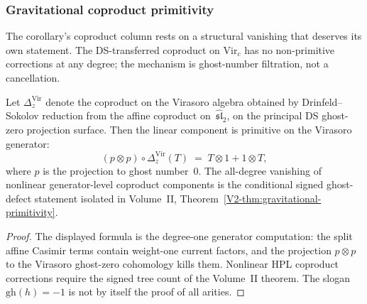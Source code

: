 \subsubsection*{Gravitational coproduct primitivity}

The corollary's coproduct column rests on a structural
vanishing that deserves its own statement. The DS-transferred
coproduct on $\mathrm{Vir}_c$ has no non-primitive corrections at
any degree; the mechanism is ghost-number filtration, not a
cancellation.

\begin{theorem}
\label{thm:grav-coproduct-primitive}
Let\/ $\Delta_z^{\mathrm{Vir}}$ denote the coproduct on the
Virasoro algebra obtained by Drinfeld--Sokolov reduction from the
affine coproduct on~$\widehat{\mathfrak{sl}}_2$, on the principal
DS ghost-zero projection surface. Then the linear component is
primitive on the Virasoro generator:
\begin{equation}\label{eq:grav-coproduct-primitive}
(p \otimes p) \circ \Delta_z^{\mathrm{Vir}}(T)
\;=\;
T \otimes 1 + 1 \otimes T,
\end{equation}
where $p$ is the projection to ghost number~$0$. The all-degree
vanishing of nonlinear generator-level coproduct components is the
conditional signed ghost-defect statement isolated in Volume~II,
Theorem~\textup{\ref*{V2-thm:gravitational-primitivity}}.
\end{theorem}

\begin{proof}
The displayed formula is the degree-one generator computation: the
split affine Casimir terms contain weight-one current factors, and
the projection \(p\otimes p\) to the Virasoro ghost-zero cohomology
kills them.  Nonlinear HPL coproduct corrections require the signed
tree count of the Volume~II theorem.  The slogan
\(\mathrm{gh}(h)=-1\) is not by itself the proof of all arities.
\end{proof}

